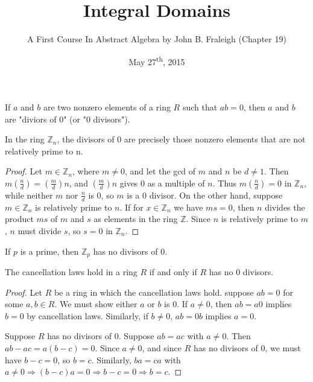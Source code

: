 \documentclass[a4paper,11pt]{article}
\title{Integral Domains}
\author{A First Course In Abstract Algebra by John B. Fraleigh (Chapter 19)}
\date{May 27\textsuperscript{th}, 2015}
\begin{document}
\maketitle
{}

\begin{outline}

    If \(a\) and \(b\) are two nonzero elements of a ring \(R\) such that \(ab = 0\), then \(a\) and 
    \(b\) are "diviors of \(0\)" (or "\(0\) divisors").

    In the ring \(\mathbb{Z}_n\), the divisors of \(0\) are precisely those nonzero elements that are 
    not relatively prime to n.
    
    \begin{proof}
      Let \(m \in \mathbb{Z}_n\), where \(m \neq 0\), and let the gcd of \(m\) and \(n\) be \(d \neq 1\). Then
      \(m(\frac{n}{d}) = (\frac{m}{d})n\), and \((\frac{m}{d})n\) gives \(0\) as a multiple of \(n\). Thus 
      \(m(\frac{n}{d}) = 0\) in \(\mathbb{Z}_n\), while neither \(m\) nor \(\frac{n}{d}\) is \(0\), so \(m\) 
      is a \(0\) divisor. On the other hand, suppose \(m \in \mathbb{Z}_n\) is relatively prime to \(n\). If 
      for \(x \in \mathbb{Z}_n\) we have \(ms = 0\), then \(n\) divides the product \(ms\) of \(m\) and \(s\) 
      as elements in the ring \(\mathbb{Z}\). Since \(n\) is relatively prime to \(m\), \(n\) must divide \(s\), 
      so \(s = 0\) in \(\mathbb{Z}_n\).
    \end{proof}
      
    If \(p\) is a prime, then \(\mathbb{Z}_p\) has no divisors of \(0\).
      
    The cancellation laws hold in a ring \(R\) if and only if \(R\) has no \(0\) divisors.
    
    \begin{proof}
      \forward
        Let \(R\) be a ring in which the cancellation laws hold. suppose \(ab = 0\) for some \(a, b \in R\).
        We must show either \(a\) or \(b\) is \(0\). If \(a \neq 0\), then \(ab = a0\) implies \(b = 0\) by cancellation laws.
        Similarly, if \(b \neq 0\), \(ab = 0b\) implies \(a = 0\).
        
      \backward
        Suppose \(R\) has no divisors of \(0\). Suppose \(ab = ac\) with \(a \neq 0\). Then  \(ab - ac = a(b-c) = 0\). 
        Since \(a \neq 0\), and since \(R\) has no divisors of \(0\), we must have \(b - c = 0\), so \(b = c\). 
        Similarly, \(ba = ca\) with \(a \neq 0 \Rightarrow (b - c)a = 0 \Rightarrow b - c = 0 \Rightarrow b = c\).
    \end{proof}


\end{outline}
\end{document}
